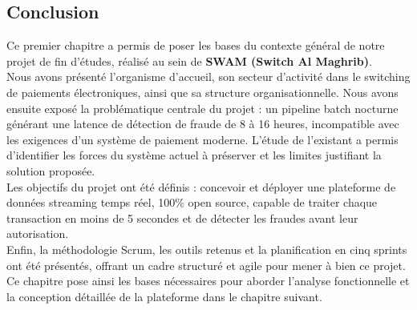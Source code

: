 \subsection*{Conclusion}
{}
\vspace{0.5cm}
Ce premier chapitre a permis de poser les bases du contexte général de notre projet de fin d'études, réalisé au sein de \textbf{SWAM (Switch Al Maghrib)}.
\\[0.2cm]
Nous avons présenté l'organisme d'accueil, son secteur d'activité dans le switching de paiements électroniques, ainsi que sa structure organisationnelle. Nous avons ensuite exposé la problématique centrale du projet : un pipeline batch nocturne générant une latence de détection de fraude de 8 à 16 heures, incompatible avec les exigences d'un système de paiement moderne. L'étude de l'existant a permis d'identifier les forces du système actuel à préserver et les limites justifiant la solution proposée.
\\[0.2cm]
Les objectifs du projet ont été définis : concevoir et déployer une plateforme de données streaming temps réel, 100\% open source, capable de traiter chaque transaction en moins de 5 secondes et de détecter les fraudes avant leur autorisation.
\\[0.2cm]
Enfin, la méthodologie Scrum, les outils retenus et la planification en cinq sprints ont été présentés, offrant un cadre structuré et agile pour mener à bien ce projet.
\\[0.2cm]
Ce chapitre pose ainsi les bases nécessaires pour aborder l'analyse fonctionnelle et la conception détaillée de la plateforme dans le chapitre suivant.
\newpage
